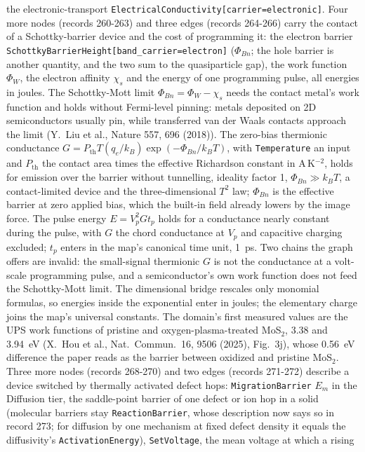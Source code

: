 \documentclass[11pt,a4paper]{article}
\begin{document}
the electronic-transport \texttt{ElectricalConductivity[carrier=electronic]}.
Four more nodes (records 260-263) and three edges (records 264-266) carry the
contact of a Schottky-barrier device and the cost of programming it: the
electron barrier \texttt{SchottkyBarrierHeight[band\_carrier=electron]} ($\Phi_{Bn}$;
the hole barrier is another quantity, and the two sum to the quasiparticle gap),
the work function $\Phi_W$, the electron affinity $\chi_s$ and the energy of one
programming pulse, all energies in joules. The Schottky-Mott limit
$\Phi_{Bn} = \Phi_W - \chi_s$ needs the contact metal's work function and holds
without Fermi-level pinning: metals deposited on 2D semiconductors usually pin,
while transferred van der Waals contacts approach the limit (Y.~Liu et al.,
Nature 557, 696 (2018)). The zero-bias thermionic conductance
$G = P_\mathrm{th} T (q_e/k_B) \exp(-\Phi_{Bn}/k_B T)$, with \texttt{Temperature}
an input and $P_\mathrm{th}$ the contact area times the effective Richardson
constant in A\,K$^{-2}$, holds for emission over the barrier without tunnelling,
ideality factor 1, $\Phi_{Bn} \gg k_B T$, a contact-limited device and the
three-dimensional $T^2$ law; $\Phi_{Bn}$ is the effective barrier at zero applied
bias, which the built-in field already lowers by the image force. The pulse
energy $E = V_p^2 G t_p$ holds for a conductance nearly constant during the
pulse, with $G$ the chord conductance at $V_p$ and capacitive charging excluded;
$t_p$ enters in the map's canonical time unit, 1~ps. Two chains the graph offers
are invalid: the small-signal thermionic $G$ is not the conductance at a
volt-scale programming pulse, and a semiconductor's own work function does not
feed the Schottky-Mott limit. The dimensional bridge rescales only monomial
formulas, so energies inside the exponential enter in joules; the elementary
charge joins the map's universal constants. The domain's first measured values
are the UPS work functions of pristine and oxygen-plasma-treated MoS$_2$, 3.38
and 3.94~eV (X.~Hou et al., Nat.\ Commun.\ 16, 9506 (2025), Fig.~3j), whose
0.56~eV difference the paper reads as the barrier between oxidized and pristine
MoS$_2$. Three more nodes (records 268-270) and two edges (records 271-272)
describe a device switched by thermally activated defect hops:
\texttt{MigrationBarrier} $E_m$ in the Diffusion tier, the saddle-point barrier of
one defect or ion hop in a solid (molecular barriers stay \texttt{ReactionBarrier},
whose description now says so in record 273; for diffusion by one mechanism at
fixed defect density it equals the diffusivity's \texttt{ActivationEnergy}), \texttt{SetVoltage}, the mean voltage at which a rising
\end{document}
